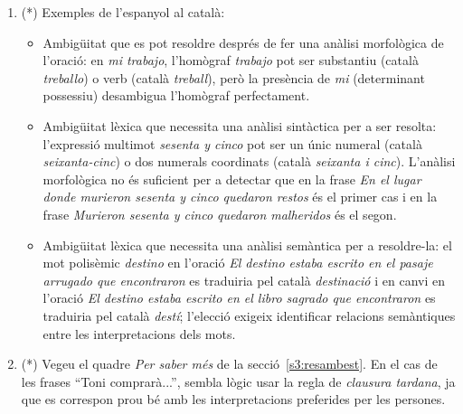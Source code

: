 \begin{enumerate}
\item (*) Exemples de l'espanyol al català:
  \begin{itemize}
  \item Ambigüitat que es pot resoldre després de fer una anàlisi
    morfològica de l'oració: en \emph{mi trabajo}, l'homògraf
    \emph{trabajo} pot ser substantiu (català \emph{treballo}) o verb
    (català \emph{treball}), però la presència de \emph{mi}
    (determinant possessiu) desambigua l'homògraf perfectament.
  \item Ambigüitat lèxica que necessita una anàlisi sintàctica per a
    ser resolta: l'expressió multimot \emph{sesenta y cinco} pot ser
    un únic numeral (català \emph{seixanta-cinc}) o dos numerals
    coordinats (català \emph{seixanta i cinc}). L'anàlisi morfològica
    no és suficient per a detectar que en la frase \emph{En el lugar
      donde murieron sesenta y cinco quedaron restos} és el primer cas
    i en la frase \emph{Murieron sesenta y cinco quedaron malheridos}
    és el segon.
  \item Ambigüitat lèxica que necessita una anàlisi semàntica per a
    resoldre-la: el mot polisèmic \emph{destino} en l'oració \emph{El
      destino estaba escrito en el pasaje arrugado que encontraron} es
    traduiria pel català \emph{destinació} i en canvi en l'oració
    \emph{El destino estaba escrito en el libro sagrado que
      encontraron} es traduiria pel català \emph{destí}; l'elecció
    exigeix identificar relacions semàntiques entre les
    interpretacions dels mots.
  \end{itemize}

\item (*) Vegeu el quadre \emph{Per saber més} de la
  secció~\ref{s3:resambest}.  En el cas de les frases ``Toni
  comprarà...'', sembla lògic usar la regla de {\em clausura tardana},
  ja que es correspon prou bé amb les interpretacions preferides per
  les persones.


\end{enumerate}
